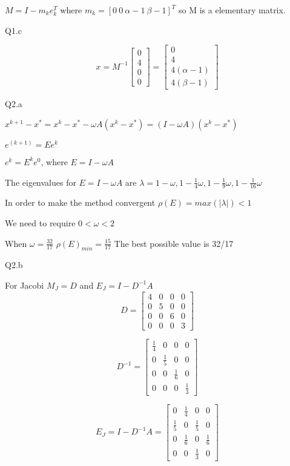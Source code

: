\documentclass[11pt]{article}
\begin{document}
\(M=I-m_k e_k^T\) where \(m_k=[0\ 0\ \alpha-1\ \beta-1]^T\) so M is a
elementary matrix.

    Q1.c

\[x=M^{-1}\left[\begin{array}{c}
0 \\
4\\
0\\
0
\end{array}\right]=
\left[\begin{array}{c}
0 \\
4\\
4(\alpha-1)\\
4(\beta-1)
\end{array}\right]\]

    Q2.a

\(x^{k+1}-x^*=x^{k}-x^*-\omega A(x^{k}-x^*)=(I-\omega A)(x^k-x^*)\)

\(e^{(k+1)}=Ee^k\)

\(e^k=E^ke^0\), where \(E=I-\omega A\)

The eigenvalues for \(E=I-\omega A\) are
\(\lambda= 1-\omega ,1-\frac{1}{4}\omega ,1-\frac{1}{9}\omega, 1-\frac{1}{16}\omega\)

In order to make the method convergent \(\rho(E)=max(|\lambda|)<1\)

We need to require \(0<\omega<2\)

When \(\omega=\frac{32}{17}\) \(\rho(E)_{min}=\frac{15}{17}\) The best
possible value is 32/17

    Q2.b

For Jacobi \(M_J=D\) and \(E_J=I-D^{-1}A\) \[D=\left[\begin{array}{cccc}
4 & 0 & 0 & 0\\
0 & 5 & 0 & 0\\
0 & 0 & 6 & 0\\
0 & 0 & 0 & 3
\end{array}\right] \]

\[D^{-1}=\left[\begin{array}{cccc}
\frac{1}{4} & 0 & 0 & 0\\
0 & \frac{1}{5} & 0 & 0\\
0 & 0 & \frac{1}{6} & 0\\
0 & 0 & 0 & \frac{1}{3}
\end{array}\right] \]

\[E_J=I-D^{-1}A=\left[\begin{array}{cccc}
0& \frac{1}{4}  & 0 & 0\\
\frac{1}{5}  & 0 & \frac{1}{5}  & 0\\
0 & \frac{1}{6}  & 0 & \frac{1}{6} \\
0 & 0 & \frac{1}{3}  & 0
\end{array}\right]
\]
\end{document}
